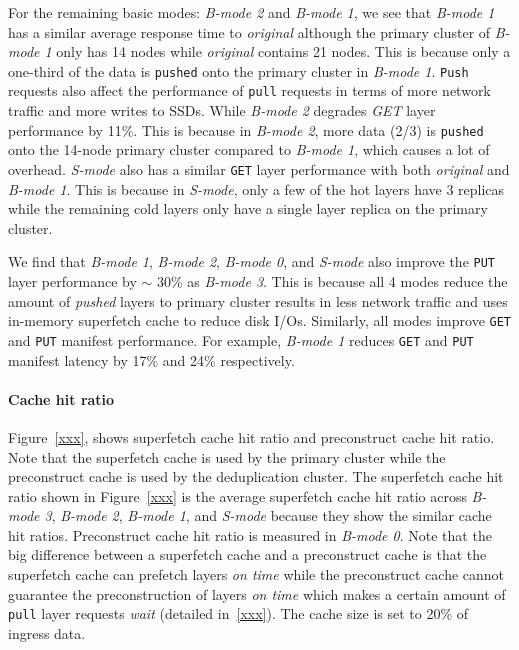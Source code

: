 For the remaining basic modes: \emph{B-mode 2} and \emph{B-mode 1},
we see that \emph{B-mode 1} has a similar average response time to \emph{original}
although the primary cluster of \emph{B-mode 1} only has 14 nodes while 
\emph{original} contains 21 nodes.
This is because only a one-third of the %
data is \texttt{pushed} onto the primary cluster in \emph{B-mode 1}.
\texttt{Push} requests also affect the performance of \texttt{pull} requests
in terms of more network traffic and more writes to SSDs.
While \emph{B-mode 2} degrades \emph{GET} layer performance by 11\%.
This is because in \emph{B-mode 2},
more data (2/3) is \texttt{pushed} onto the 14-node primary cluster compared to \emph{B-mode 1},
which causes a lot of overhead.
\emph{S-mode} also has a similar \texttt{GET} layer performance with both \emph{original} and \emph{B-mode 1}.
This is because in \emph{S-mode}, only a few of the hot layers have 3 replicas while the remaining cold layers only have a single layer replica on the primary cluster. 

We find that
\emph{B-mode 1}, \emph{B-mode 2}, \emph{B-mode 0}, and \emph{S-mode}
 also improve the \texttt{PUT} layer performance by $\sim$ 30\% as \emph{B-mode 3}.
This is because
all 4 modes reduce the amount of \emph{pushed} layers to primary cluster results in
less network traffic and uses in-memory superfetch cache to reduce disk I/Os.
Similarly,
all modes improve \texttt{GET} and \texttt{PUT} manifest performance.
For example, \emph{B-mode 1} reduces \texttt{GET} and \texttt{PUT}
manifest latency by 17\% and 24\% respectively.

\paragraph{Cache hit ratio}

Figure~\ref{xxx},
shows superfetch cache hit ratio and preconstruct cache hit ratio.
Note that the superfetch cache is used by the primary cluster while the preconstruct cache is used by the deduplication cluster.
The superfetch cache hit ratio shown in Figure~\ref{xxx} is the average superfetch cache hit ratio across \emph{B-mode 3}, \emph{B-mode 2}, \emph{B-mode 1}, and \emph{S-mode} because they show the similar cache hit ratios.
Preconstruct cache hit ratio is measured in \emph{B-mode 0}.
Note that the big difference between a superfetch cache and a preconstruct cache is that the superfetch cache can prefetch layers \emph{on time} while the preconstruct cache cannot guarantee the preconstruction of layers \emph{on time} which makes a certain amount of \texttt{pull} layer requests \emph{wait} (detailed in~\ref{xxx}).
The cache size is set to 20\% of ingress data.

